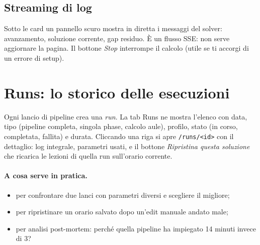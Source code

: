 \subsection{Streaming di log}

Sotto le card un pannello scuro mostra in diretta i messaggi del
solver: avanzamento, soluzione corrente, gap residuo. \`E un
flusso SSE: non serve aggiornare la pagina. Il bottone
\emph{Stop} interrompe il calcolo (utile se ti accorgi di un
errore di setup).


\section{Runs: lo storico delle esecuzioni}
\label{sec:tab_runs}

Ogni lancio di pipeline crea una \emph{run}. La tab Runs ne
mostra l'elenco con data, tipo (pipeline completa, singola
phase, calcolo aule), profilo, stato (in corso, completata,
fallita) e durata. Cliccando una riga si apre
\texttt{/runs/<id>} con il dettaglio: log integrale, parametri
usati, e il bottone \emph{Ripristina questa soluzione} che
ricarica le lezioni di quella run sull'orario corrente.

\paragraph{A cosa serve in pratica.}
\begin{itemize}
\item per confrontare due lanci con parametri diversi e
  scegliere il migliore;
\item per ripristinare un orario salvato dopo un'edit manuale
  andato male;
\item per analisi post-mortem: perch\'e quella pipeline ha
  impiegato 14 minuti invece di 3?
\end{itemize}




